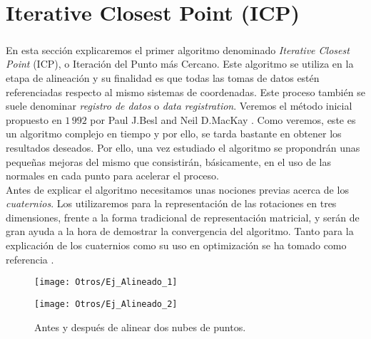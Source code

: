 \chapter{Iterative Closest Point (ICP)}
	\thispagestyle{empty}
	
	\newcommand{\ii}{\textbf{\emph{i}}}
	\newcommand{\jj}{\textbf{\emph{j}}}
	\newcommand{\kk}{\textbf{\emph{k}}}
	\newcommand{\qq}{\textbf{\emph{q}}}
	\newcommand{\pp}{\textbf{\emph{p}}}
	\newcommand{\nn}{\textbf{\emph{n}}}
	
	\paragraph{}En esta sección explicaremos el primer algoritmo denominado \textit{Iterative Closest Point} (ICP), o Iteración del Punto más Cercano. Este algoritmo se utiliza en la etapa de alineación y su finalidad es que todas las tomas de datos estén referenciadas respecto al mismo sistemas de coordenadas. Este proceso también se suele denominar \textit{registro de datos} o \textit{data registration}. Veremos el método inicial propuesto en $ 1\,992 $ por Paul J.Besl and Neil D.MacKay \cite{ICPBesl}. Como veremos, este es un algoritmo complejo en tiempo y por ello, se tarda bastante en obtener los resultados deseados. Por ello, una vez estudiado el algoritmo se propondrán unas pequeñas mejoras del mismo que consistirán, básicamente, en el uso de las normales en cada punto para acelerar el proceso.\\
	
	Antes de explicar el algoritmo necesitamos unas nociones previas acerca de los \textit{cuaternios}. Los utilizaremos para la representación de las rotaciones en tres dimensiones, frente a la forma tradicional de representación matricial, y serán de gran ayuda a la hora de demostrar la convergencia del algoritmo. Tanto para la explicación de los cuaternios como su 
	uso en optimización se ha tomado como referencia \cite{QuatYan}.
\begin{figure}[h!]
	\begin{minipage}{0.5\textwidth}
		\texttt{[image: Otros/Ej\_Alineado\_1]} 
	\end{minipage}
	\begin{minipage}{0.5\textwidth}
		\texttt{[image: Otros/Ej\_Alineado\_2]}
	\end{minipage}
	\caption{Antes y después de alinear dos nubes de puntos.}
\end{figure}

